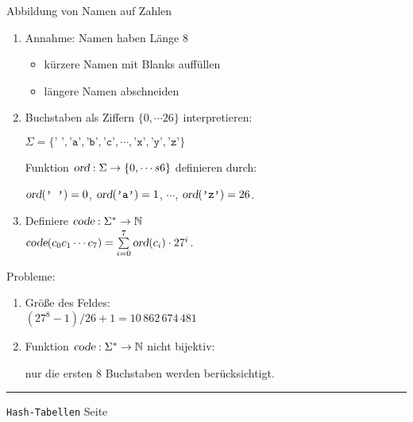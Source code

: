 \documentclass{slides}
\newcounter{mypage}
\begin{document}

\begin{slide}{}
\normalsize

\begin{center}
Abbildung von Namen auf Zahlen
\end{center}
\vspace*{0.5cm}

\footnotesize
\begin{enumerate}
\item Annahme: Namen haben L\"ange 8
      \begin{itemize}
      \item k\"urzere Namen mit Blanks auff\"ullen
      \item l\"angere Namen abschneiden
      \end{itemize}
\item Buchstaben als Ziffern $\{0, \cdots 26\}$ interpretieren:
  
      $\Sigma = \{ \texttt{' '}, \texttt{'a'}, \texttt{'b'}, \texttt{'c'}, \cdots, \texttt{'x'}, \texttt{'y'}, \texttt{'z'} \}$ 

      Funktion $\textsl{ord}: \Sigma \rightarrow \{0, \cdots s6\}$ definieren durch: 

      $\textsl{ord}(\texttt{' '}) = 0$, $\textsl{ord}(\texttt{'a'}) = 1$, 
      $\cdots$, $\textsl{ord}(\texttt{'z'}) = 26$.

\item Definiere $\textsl{code}: \Sigma^* \rightarrow \mathbb{N}$ \\[0.2cm]
      \hspace*{1.3cm} 
      $\textsl{code}(c_0c_1\cdots c_7) = \sum\limits_{i=0}^7 \textsl{ord}(c_i) \cdot 27^i$.
\end{enumerate}
Probleme: 
\begin{enumerate}
\item Gr\"o{\ss}e des Feldes: \\[0.2cm]
      \hspace*{1.3cm} $(27^8-1) / 26 + 1 = 10\,862\,674\,481$ \\[0.2cm]
\item Funktion $\textsl{code}: \Sigma^* \rightarrow \mathbb{N}$ nicht bijektiv:
  
      nur die ersten 8 Buchstaben werden ber\"ucksichtigt.
\end{enumerate}

\vspace*{\fill}
\tiny \addtocounter{mypage}{1}
\rule{17cm}{1mm}
\texttt{Hash-Tabellen} \hspace*{\fill} Seite 
\end{slide}
\end{document}

